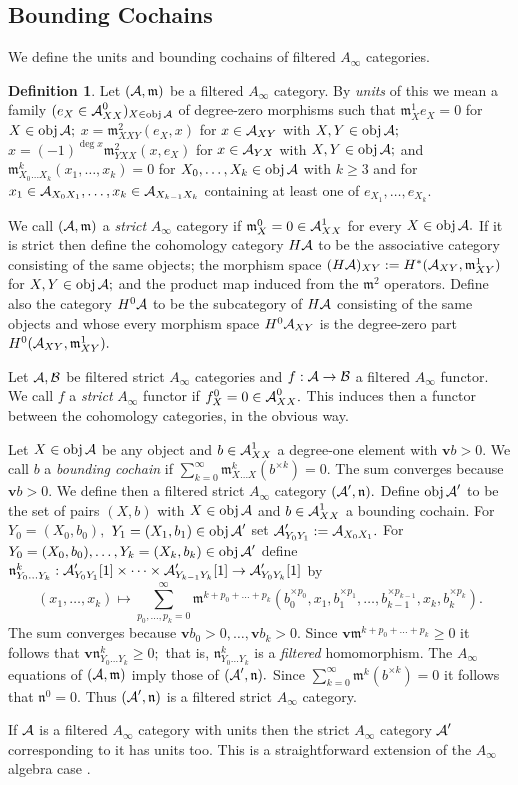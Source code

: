 \documentclass{article}
\theoremstyle{plain}%
\theoremstyle{definition}
\newtheorem{dfn}[thm]{Definition}
\numberwithin{equation}{section}
\numberwithin{figure}{section}
\def\l{\label}
\def\fm{{\mathfrak m}}
\def\fn{{\mathfrak n}}
\def\ge{\geqslant}
\def\cA{{\mathbin{\cal A}}}
\def\cB{{\mathbin{\cal B}}}
\def\ts{\textstyle}
\def\iy{\infty}
\def\t{\times}
\def\v{{\mathbf{v}}}\def\cl{{\rm cl}}\def\alg{{\rm alg}}\def\geom{{\rm geom}}\def\loc{{\rm loc}}\def\dirlim{\displaystyle\varinjlim}
\begin{document}
\subsection{Bounding Cochains}\l{sec: bounding}

We define the units and bounding cochains of filtered $A_\iy$ categories.
\begin{dfn}\l{dfn: strict A_infty}
Let $(\cA,\fm)$ be a filtered $A_\iy$ category. By {\it units} of this we mean a family $(e_X\in\cA^0_{XX})_{X\in\obj\cA}$ of degree-zero morphisms such that $\fm^1_X e_X=0$ for $X\in\obj\cA;$ $x=\fm^2_{XXY}(e_X,x)$ for $x\in\cA_{XY}$ with $X,Y\in\obj\cA;$  $x=(-1)^{\deg x}\fm^2_{YXX}(x,e_X)$ for $x\in\cA_{YX}$ with $X,Y\in\obj\cA;$ and $\fm^k_{X_0\dots X_k}(x_1,\dots, x_k)=0$ for $X_0,\dots,X_k\in\obj\cA$ with $k\ge3$ and for $x_1\in\cA_{X_0X_1},\dots,x_k\in\cA_{X_{k-1}X_k}$ containing at least one of $e_{X_1},\dots,e_{X_k}.$

We call $(\cA,\fm)$ a {\it strict} $A_\iy$ category if $\fm^0_X=0\in\cA^1_{XX}$ for every $X\in\obj\cA.$
If it is strict then define the cohomology category $H\cA$ to be the associative category consisting of the same objects; the morphism space $(H\cA)_{XY}:=H^*(\cA_{XY},\fm^1_{XY})$ for $X,Y\in\obj\cA;$ and the product map induced from the $\fm^2$ operators. Define also the category $H^0\cA$ to be the subcategory of $H\cA$ consisting of the same objects and whose every morphism space $H^0\cA_{XY}$ is the degree-zero part $H^0(\cA_{XY},\fm^1_{XY}).$

Let $\cA,\cB$ be filtered strict $A_\iy$ categories and $f:\cA\to\cB$ a filtered $A_\iy$ functor. We call $f$ a {\it strict} $A_\iy$ functor if $f^0_X=0\in \cA^0_{XX}.$ This induces then a functor between the cohomology categories, in the obvious way.

Let $X\in\obj\cA$ be any object and $b\in\cA^1_{XX}$ a degree-one element with $\v b>0.$ We call $b$ a {\it bounding cochain} if $\sum_{k=0}^\iy\fm^k_{X\dots X}(b^{\t k})=0.$ The sum converges because $\v b>0.$
We define then a filtered strict $A_\iy$ category $(\cA',\fn).$ Define $\obj\cA'$ to be the set of pairs $(X,b)$ with $X\in\obj\cA$ and $b\in\cA^1_{XX}$ a bounding cochain. For $Y_0=(X_0,b_0),$ $Y_1=(X_1,b_1)\in\obj\cA'$ set $\cA'_{Y_0Y_1}:=\cA_{X_0X_1}.$ 
For $Y_0=(X_0,b_0),\dots,Y_k=(X_k,b_k)\in\obj\cA'$ define $\fn^k_{Y_0\dots Y_k}:\cA'_{Y_0Y_1}[1]\times\dots\times\cA'_{Y_{k-1}Y_k}[1]\to \cA'_{Y_0Y_k}[1]$ by
\[(x_1,\dots,x_k)\mapsto\ts\sum_{p_0,\dots,p_k=0}^\iy\fm^{k+p_0+\dots+p_k}(b_0^{\t p_0}, x_1, b_1^{\t p_1},\dots,b_{k-1}^{\t p_{k-1}}, x_k, b_k^{\t p_k}).\]
The sum converges because $\v b_0>0,\dots,\v b_k>0.$
Since $\v\fm^{k+p_0+\dots+p_k}\ge0$ it follows that $\v\fn^k_{Y_0\dots Y_k}\ge0;$ that is, $\fn^k_{Y_0\dots Y_k}$ is a {\it filtered} homomorphism.
The $A_\iy$ equations of $(\cA,\fm)$ imply those of $(\cA',\fn).$
Since $\sum_{k=0}^\iy\fm^k(b^{\t k})=0$ it follows that $\fn^0=0.$ Thus $(\cA',\fn)$ is a filtered strict $A_\iy$ category.

If $\cA$ is a filtered $A_\iy$ category with units then the strict $A_\iy$ category $\cA'$ corresponding to it has units too. This is a straightforward extension of the $A_\iy$ algebra case \cite[Lemma 5.2.17]{FOOO}.
\end{dfn}
\end{document}
